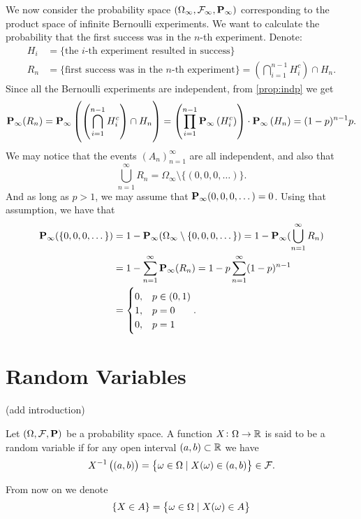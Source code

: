 \documentclass[11pt,a4paper]{article}
\begin{document}
  \begin{example}
    We now consider the probability space 
    $(\Omega_{\infty}, \mathcal F_{\infty}, \mathbf{P}_{\infty})$
    corresponding to the product space of infinite Bernoulli experiments.
    We want to calculate the probability that the first success was in 
    the $n$-th experiment. Denote:
    \begin{align*}
      H_i &= \{\text{the $i$-th experiment resulted in success}\} \\
      R_n &= \{\text{first success was in the $n$-th experiment}\} = 
      \left(\bigcap_{i=1}^{n-1} H_i^c\right) \cap H_n.
    \end{align*}
    Since all the Bernoulli experiments are independent, from 
    \autoref{prop:indp} we get
    \[
      \mathbf{P}_{\infty}(R_{n}) = 
      \mathbf{P}_{\infty} \left(\left(\bigcap_{i=1}^{n-1} H_i^c\right) \cap H_n\right) = 
      \left(\prod_{i=1}^{n-1} \mathbf{P}_{\infty} \left(H_{i}^{c}\right)\right) \cdot \mathbf{P}_{\infty} \left(H_{n}\right) =
      (1-p)^{n-1}p.
    \]
    We may notice that the events $(A_n)_{n=1}^{\infty}$ are all independent,
    and also that
    \[
      \bigcup_{n=1}^{\infty} R_n = \Omega_\infty \setminus \{(0,0,0,\dots)\}.
    \]
    And as long as $p > 1$, we may assume that 
    $\mathbf{P}_\infty(0,0,0,\dots) = 0$.
    Using that assumption, we have that
    \begin{align*}
      \mathbf{P}_{\infty}(\{0,0,0,\dots\}) &= 
      1 - \mathbf{P}_\infty(\Omega_\infty \setminus \{0,0,0,\dots\}) =
      1 - \mathbf{P}_\infty(\bigcup_{n=1}^{\infty} R_n) \\ &=
      1 - \sum_{n=1}^{\infty} \mathbf{P}_\infty(R_n) =
      1 - p \sum_{n=1}^{\infty} (1-p)^{n-1} \\ &=
      \begin{cases}
        0, &p \in (0,1) \\
        1, &p = 0 \\
        0, &p = 1
      \end{cases}.
    \end{align*}
  \end{example}

  \newpage

  \section{Random Variables}
  (add introduction)
  \begin{definition}
    Let $(\Omega, \mathcal F, \mathbf{P})$ be a probability space.
    A function $X \colon \Omega \to \mathbb{R}$ is said to be a random variable if for
    any open interval $(a,b) \subset \mathbb{R}$ we have
    \[
      X^{-1}\left((a,b)\right) = 
      \set{\omega \in \Omega \mid X(\omega) \in (a,b)} \in \mathcal F.
    \]
  \end{definition}
  \begin{remark}
    From now on we denote
    \[
      \{X \in A\} = \set{\omega \in \Omega \mid X(\omega) \in A}
    \]
  \end{remark}
  
\end{document}
